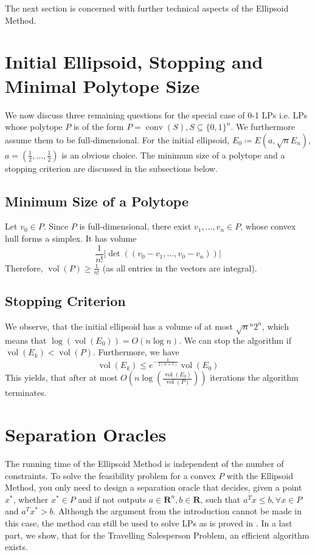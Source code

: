\documentclass[10pt]{article}
\newcommand{\R}{\mathbf{R}}
\newcommand{\transpose}{T}
\newcommand{\vol}{\operatorname{vol}}
\newcommand{\conv}{\operatorname{conv}}
\begin{document}
The next section is concerned with further technical aspects of the Ellipsoid Method.
\section{Initial Ellipsoid, Stopping and Minimal Polytope Size}
We now discuss three remaining questions for the special case of 0-1 LPs i.e. LPs whose polytope $P$ is of the form $P = \conv (S), S \subseteq \{0,1\}^n$. We furthermore assume them to be full-dimensional. For the initial ellipsoid, $E_0 \coloneqq E(a,\sqrt{n}E_n)$, $a=(\frac{1}{2}, \dots, \frac{1}{2})$ is an obvious choice. The minimum size of a polytope and a stopping criterion are discussed in the subsections below.
\subsection{Minimum Size of a Polytope}
Let $v_0 \in P$. Since $P$ is full-dimensional, there exist $v_1, \dots, v_n \in P$, whose convex hull forms a simplex. It has volume
\[
\frac{1}{n!} \left\lvert\det ((v_0-v_1, \dots, v_0-v_n))\right\rvert
\]
Therefore, $\vol (P) \ge \frac{1}{n!}$ (as all entries in the vectors are integral).
\subsection{Stopping Criterion}
We observe, that the initial ellipsoid has a volume of at most $\sqrt{n}^{n} 2^n$, which means that $\log (\vol (E_0)) = O(n \log n)$. We can stop the algorithm if $\vol (E_k) < \vol(P)$. Furthermore, we have
\[
\vol (E_k)\le e^{-\frac{k}{2(n+1)}} \vol (E_0)
\]
This yields, that after at most $O(n \log (\frac{\vol (E_0)}{\vol (P)}))$ iterations the algorithm terminates.
\section{Separation Oracles}\label{sec:oracles}
The running time of the Ellipsoid Method is independent of the number of constraints. To solve the feasibility problem for a convex $P$ with the Ellipsoid Method, you only need to design a separation oracle that decides, given a point $x^*$, whether $x^*\in P$ and if not outputs $a \in \R^n, b \in \R$, such that $a^\transpose x \le b, \forall x \in P$ and $a^\transpose x^* > b$. Although the argument from the introduction cannot be made in this case, the method can still be used to solve LPs as is proved in \cite{consequences}. In a last part, we show, that for the Travelling Salesperson Problem, an efficient algorithm exists.
\end{document}
